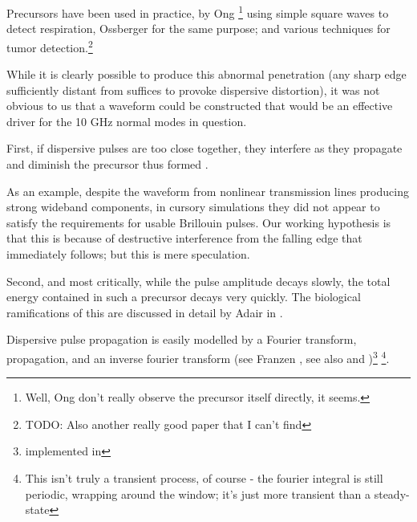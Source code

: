 \documentclass[paper.tex]{subfiles}
\begin{document}
Precursors have been used in practice, by Ong \cite{Detection2003}\footnote{Well, Ong don't really observe the precursor itself directly, it seems.} using simple square waves to detect respiration\footnotemark, Ossberger \cite{Noninvasive2004} for the same purpose; and various techniques for tumor detection.\footnote{TODO: Also another really good paper that I can't find}

While it is clearly possible to produce this abnormal penetration (any sharp edge sufficiently distant from suffices to provoke dispersive distortion), it was not obvious to us that a waveform could be constructed that would be an effective driver for the 10 GHz normal modes in question. 

First, if dispersive pulses are too close together, they interfere as they propagate and diminish the precursor thus formed \cite{Dynamical2005}.

As an example, despite the waveform from nonlinear transmission lines\cite{NLTL6275} producing strong wideband components, in cursory simulations they did not appear to satisfy the requirements for usable Brillouin pulses. Our working hypothesis is that this is because of destructive interference from the falling edge that immediately follows; but this is mere speculation.

Second, and most critically, while the pulse amplitude decays slowly, the total energy contained in such a precursor decays very quickly. The biological ramifications of this are discussed in detail by Adair in \cite{Biophysics2000}.

%

Dispersive pulse propagation is easily modelled by a Fourier transform, propagation, and an inverse fourier transform (see Franzen \cite{Wideband1999}, see also \cite{Comments1993} and \cite{Shortrisetime1989})\footnote{implemented in} \footnote{This isn't truly a transient process, of course - the fourier integral is still periodic, wrapping around the window; it's just more transient than a steady-state}.
\end{document}
